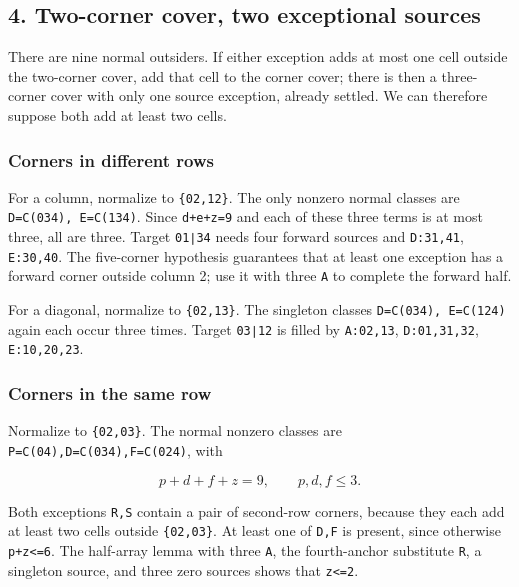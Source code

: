 \documentclass[
  10pt,
]{article}
\begin{document}
\hypertarget{two-corner-cover-two-exceptional-sources}{%
\subsection*{4. Two-corner cover, two exceptional
sources}\label{two-corner-cover-two-exceptional-sources}}

There are nine normal outsiders. If either exception adds at most one
cell outside the two-corner cover, add that cell to the corner cover;
there is then a three-corner cover with only one source exception,
already settled. We can therefore suppose both add at least two cells.

\hypertarget{corners-in-different-rows}{%
\subsubsection*{Corners in different
rows}\label{corners-in-different-rows}}

For a column, normalize to \texttt{\{02,12\}}. The only nonzero normal
classes are \texttt{D=C(034),\ E=C(134)}. Since \texttt{d+e+z=9} and
each of these three terms is at most three, all are three. Target
\texttt{01∣34} needs four forward sources and \texttt{D:31,41},
\texttt{E:30,40}. The five-corner hypothesis guarantees that at least
one exception has a forward corner outside column 2; use it with three
\texttt{A} to complete the forward half.

For a diagonal, normalize to \texttt{\{02,13\}}. The singleton classes
\texttt{D=C(034),\ E=C(124)} again each occur three times. Target
\texttt{03∣12} is filled by \texttt{A:02,13}, \texttt{D:01,31,32},
\texttt{E:10,20,23}.

\hypertarget{corners-in-the-same-row}{%
\subsubsection*{Corners in the same row}\label{corners-in-the-same-row}}

Normalize to \texttt{\{02,03\}}. The normal nonzero classes are
\texttt{P=C(04),D=C(034),F=C(024)}, with

\[
p+d+f+z=9,\qquad p,d,f\le3.
\]

Both exceptions \texttt{R,S} contain a pair of second-row corners,
because they each add at least two cells outside \texttt{\{02,03\}}. At
least one of \texttt{D,F} is present, since otherwise
\texttt{p+z\textless{}=6}. The half-array lemma with three \texttt{A},
the fourth-anchor substitute \texttt{R}, a singleton source, and three
zero sources shows that \texttt{z\textless{}=2}.
\end{document}
